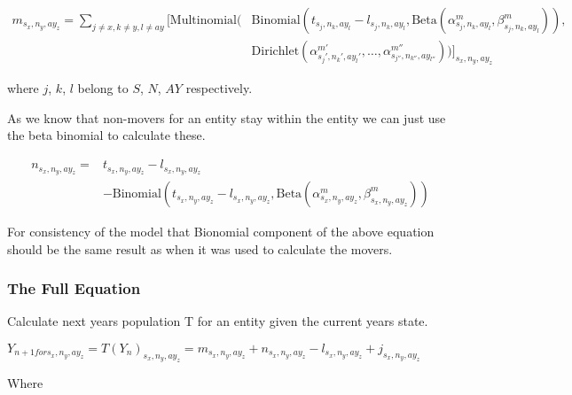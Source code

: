 \documentclass[margin=5mm]{article}
\begin{document}
\begin{equation*}
  \begin{split}
    m_{s_x,n_y,ay_z} = \sum_{j \neq x, k \neq y , l \neq ay }\bigg[
        \text{Multinomial}( & \text{Binomial}(t_{s_j,n_k,ay_l} - l_{s_j,n_k,ay_l}, 
        \text{Beta}(\alpha^m_{s_j,n_k,ay_l},\beta^m_{s_j,n_k,ay_l})),
        \\ &  \text{Dirichlet}(\alpha^{m'}_{s_j',n_k',ay_l'}, \dots,
        \alpha^{m''}_{s_{j''},n_{k''},ay_{l''}}))\bigg]_{s_x,n_y,ay_z}
\end{split}
\end{equation*}

where $j$, $k$, $l$ belong to $S$, $N$, $AY$ respectively.

As we know that non-movers for an entity stay within the entity we can
just use the beta binomial to calculate these.

\begin{equation*}
  \begin{split}
    n_{s_x,n_y,ay_z} = & t_{s_x,n_y,ay_z}
    - l_{s_x,n_y,ay_z} \\ & - \text{Binomial}(t_{s_x,n_y,ay_z} - l_{s_x,n_y,ay_z}, 
\text{Beta}(\alpha^m_{s_x,n_y,ay_z},\beta^m_{s_x,n_y,ay_z}))
\end{split}
\end{equation*}

For consistency of the model that Bionomial component of the above
equation should be the same result as when it was used to calculate
the movers.

\subsubsection{The Full Equation}

Calculate next years population T for an entity given the current
years state.

$Y_{n+1 for s_x,n_y,ay_z} = T(Y_n)_{s_x,n_y,ay_z} = m_{s_x,n_y,ay_z} + n_{s_x,n_y,ay_z} -
l_{s_x,n_y,ay_z} + j_{s_x,n_y,ay_z} $

Where
\end{document}
